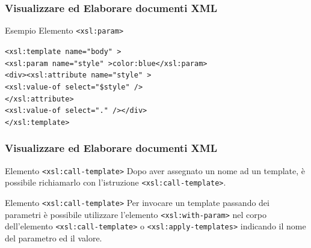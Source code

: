 \begin{frame}
    \frametitle{Visualizzare ed Elaborare documenti XML}
    \addtocounter{nframe}{1}
    

     \begin{block}{Esempio Elemento \texttt{<xsl:param>}}
        
        \texttt{<xsl:template name="body" >}
        \\\texttt{<xsl:param name="style" >color:blue</xsl:param>}
        \\\texttt{<div><xsl:attribute name="style" >}
        \\\texttt{<xsl:value-of select="\$style" />}
        \\\texttt{</xsl:attribute>}
        \\\texttt{<xsl:value-of select="." /></div>}
        \\\texttt{</xsl:template>}

     \end{block}
\end{frame}

\begin{frame}
    \frametitle{Visualizzare ed Elaborare documenti XML}
    \addtocounter{nframe}{1}
    

     \begin{block}{Elemento \texttt{<xsl:call-template>}}
        Dopo aver assegnato un nome ad un template, è possibile richiamarlo con l’istruzione \texttt{<xsl:call-template>}.
     \end{block}

     \begin{block}{Elemento \texttt{<xsl:call-template>}}
        Per invocare un template passando dei parametri è possibile utilizzare l’elemento \texttt{<xsl:with-param>} nel corpo dell’elemento \texttt{<xsl:call-template>} o \texttt{<xsl:apply-templates>} indicando il nome del parametro ed il valore.
     \end{block}

\end{frame}


